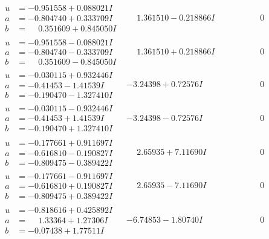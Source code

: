 \documentclass[1p]{elsarticle_modified}
\theoremstyle{definition}
\begin{document}
$$\begin{array}{c|c|c}
\begin{aligned}
u &= -0.951558 + 0.088021 I \\
a &= -0.804740 + 0.333709 I \\
b &= \phantom{-}0.351609 + 0.845050 I\end{aligned}
 & \phantom{-}1.361510 - 0.218866 I & \phantom{-0.000000 } 0 \\ \hline\begin{aligned}
u &= -0.951558 - 0.088021 I \\
a &= -0.804740 - 0.333709 I \\
b &= \phantom{-}0.351609 - 0.845050 I\end{aligned}
 & \phantom{-}1.361510 + 0.218866 I & \phantom{-0.000000 } 0 \\ \hline\begin{aligned}
u &= -0.030115 + 0.932446 I \\
a &= -0.41453 - 1.41539 I \\
b &= -0.190470 - 1.327410 I\end{aligned}
 & -3.24398 + 0.72576 I & \phantom{-0.000000 } 0 \\ \hline\begin{aligned}
u &= -0.030115 - 0.932446 I \\
a &= -0.41453 + 1.41539 I \\
b &= -0.190470 + 1.327410 I\end{aligned}
 & -3.24398 - 0.72576 I & \phantom{-0.000000 } 0 \\ \hline\begin{aligned}
u &= -0.177661 + 0.911697 I \\
a &= -0.616810 - 0.190827 I \\
b &= -0.809475 - 0.389422 I\end{aligned}
 & \phantom{-}2.65935 + 7.11690 I & \phantom{-0.000000 } 0 \\ \hline\begin{aligned}
u &= -0.177661 - 0.911697 I \\
a &= -0.616810 + 0.190827 I \\
b &= -0.809475 + 0.389422 I\end{aligned}
 & \phantom{-}2.65935 - 7.11690 I & \phantom{-0.000000 } 0 \\ \hline\begin{aligned}
u &= -0.818616 + 0.425892 I \\
a &= \phantom{-}1.33364 + 1.27306 I \\
b &= -0.07438 + 1.77511 I\end{aligned}
 & -6.74853 - 1.80740 I & \phantom{-0.000000 } 0 \\ \hline\begin{aligned}

\end{aligned}
\end{array}$$
\end{document}
